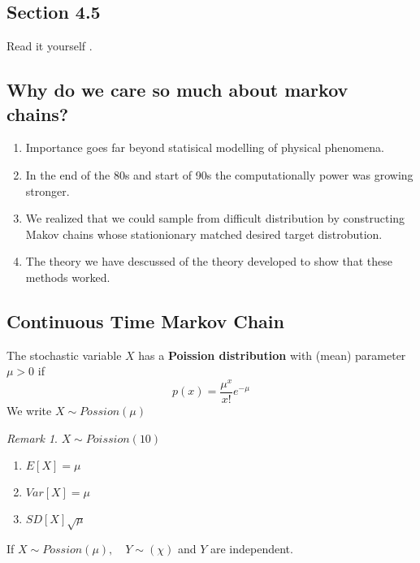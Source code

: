 \documentclass{article}
\theoremstyle{remark}
\newtheorem*{remark}{Remark}
\begin{document}
\subsection{Section 4.5}%
\label{sub:section_4_5}
Read it yourself .


\subsection{Why do we care so much about markov chains?}%
\label{sub:why_do_we_care_so_much_about_markov_chains_}

\begin{enumerate}[label=(\roman*)]
  \item Importance goes far beyond statisical modelling of physical phenomena.
  \item In the end of the 80s and start of 90s the computationally power was growing stronger.
  \item We realized that we could sample from difficult distribution  by constructing Makov chains whose stationionary matched desired target distrobution.
  \item The theory we have descussed of the theory developed to show that these methods worked.
\end{enumerate}

\subsection{Continuous Time Markov Chain}%
\label{sub:continuous_time_markov_chain}


\begin{definition}
  The stochastic variable $X$  has a \textbf{Poission distribution}  with (mean) parameter $\mu > 0$ if \[
  p\left( x \right) = \frac{\mu ^{x}}{x!}  e^{- \mu }
  \] 
  We write $X \sim Possion (\mu )$
\end{definition}

\begin{remark}
  $X \sim Poission (10)$
   \begin{enumerate}[label=(\roman*)]
    \item $E\left[ X \right] = \mu $
    \item $Var\left[ X \right] = \mu $
    \item $SD\left[ X \right] \sqrt{\mu } $
  \end{enumerate}
\end{remark}

\begin{theorem}
  If $X \sim Possion (\mu ), \quad  Y \sim \left( \chi  \right) $ and $Y $ are independent. 
\end{theorem}
\end{document}
